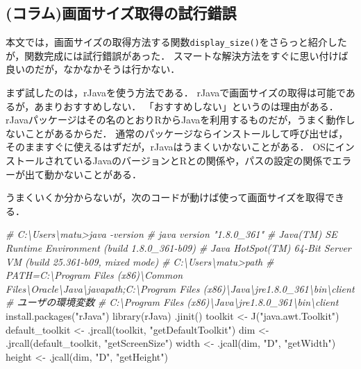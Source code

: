 \documentclass[
]{article}
\newenvironment{Shaded}{\begin{snugshade}}{\end{snugshade}}
\newcommand{\CommentTok}[1]{\textcolor[rgb]{0.56,0.35,0.01}{\textit{#1}}}
\newcommand{\FunctionTok}[1]{\textcolor[rgb]{0.00,0.00,0.00}{#1}}
\newcommand{\NormalTok}[1]{#1}
\newcommand{\OtherTok}[1]{\textcolor[rgb]{0.56,0.35,0.01}{#1}}
\newcommand{\StringTok}[1]{\textcolor[rgb]{0.31,0.60,0.02}{#1}}
\begin{document}
\hypertarget{ux30b3ux30e9ux30e0ux753bux9762ux30b5ux30a4ux30baux53d6ux5f97ux306eux8a66ux884cux932fux8aa4}{%
\subsection{(コラム)画面サイズ取得の試行錯誤}\label{ux30b3ux30e9ux30e0ux753bux9762ux30b5ux30a4ux30baux53d6ux5f97ux306eux8a66ux884cux932fux8aa4}}

本文では，画面サイズの取得方法する関数\texttt{display\_size()}をさらっと紹介したが，関数完成には試行錯誤があった．
スマートな解決方法をすぐに思い付けば良いのだが，なかなかそうは行かない．

まず試したのは，rJavaを使う方法である．
rJavaで画面サイズの取得は可能であるが，あまりおすすめしない．
「おすすめしない」というのは理由がある．
rJavaパッケージはその名のとおりRからJavaを利用するものだが，うまく動作しないことがあるからだ．
通常のパッケージならインストールして呼び出せば，そのまますぐに使えるはずだが，rJavaはうまくいかないことがある．
OSにインストールされているJavaのバージョンとRとの関係や，パスの設定の関係でエラーが出て動かないことがある．

うまくいくか分からないが，次のコードが動けば使って画面サイズを取得できる．

\begin{Shaded}
\begin{Highlighting}[]
  \CommentTok{\# C:\textbackslash{}Users\textbackslash{}matu\textgreater{}java {-}version}
  \CommentTok{\# java version "1.8.0\_361"}
  \CommentTok{\# Java(TM) SE Runtime Environment (build 1.8.0\_361{-}b09)}
  \CommentTok{\# Java HotSpot(TM) 64{-}Bit Server VM (build 25.361{-}b09, mixed mode)}
  \CommentTok{\# C:\textbackslash{}Users\textbackslash{}matu\textgreater{}path}
  \CommentTok{\# PATH=C:\textbackslash{}Program Files (x86)\textbackslash{}Common Files\textbackslash{}Oracle\textbackslash{}Java\textbackslash{}javapath;C:\textbackslash{}Program Files (x86)\textbackslash{}Java\textbackslash{}jre1.8.0\_361\textbackslash{}bin\textbackslash{}client}
  \CommentTok{\# ユーザの環境変数}
  \CommentTok{\#   C:\textbackslash{}Program Files (x86)\textbackslash{}Java\textbackslash{}jre1.8.0\_361\textbackslash{}bin\textbackslash{}client}
\FunctionTok{install.packages}\NormalTok{(}\StringTok{"rJava"}\NormalTok{)}
\FunctionTok{library}\NormalTok{(rJava)}
\FunctionTok{.jinit}\NormalTok{()}
\NormalTok{toolkit }\OtherTok{\textless{}{-}} \FunctionTok{J}\NormalTok{(}\StringTok{"java.awt.Toolkit"}\NormalTok{)}
\NormalTok{default\_toolkit }\OtherTok{\textless{}{-}} \FunctionTok{.jrcall}\NormalTok{(toolkit, }\StringTok{"getDefaultToolkit"}\NormalTok{)}
\NormalTok{dim }\OtherTok{\textless{}{-}} \FunctionTok{.jrcall}\NormalTok{(default\_toolkit, }\StringTok{"getScreenSize"}\NormalTok{)}
\NormalTok{width }\OtherTok{\textless{}{-}} \FunctionTok{.jcall}\NormalTok{(dim, }\StringTok{"D"}\NormalTok{, }\StringTok{"getWidth"}\NormalTok{)}
\NormalTok{height }\OtherTok{\textless{}{-}} \FunctionTok{.jcall}\NormalTok{(dim, }\StringTok{"D"}\NormalTok{, }\StringTok{"getHeight"}\NormalTok{)}
\end{Highlighting}
\end{Shaded}
\end{document}

